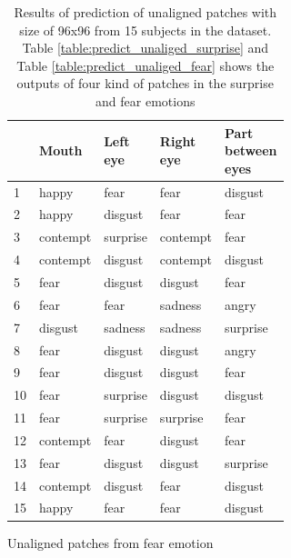 \begin{table}
\begin{subtable}{3in}
\begin{tabular}{|*{1}{p{0.2cm}<{\centering}|} *{1}{p{1.24cm}<{\centering}|} *{1}{p{1.2cm}<{\centering}|} *{1}{p{1.24cm}<{\centering}|} *{1}{p{1.2cm}<{\centering}|}}
    \hline
      & Mouth & \tabincell{c}{Left\\ eye} & \tabincell{c}{Right\\ eye} & \tabincell{c}{Part \\ between\\ eyes} \\
    \hline
    1 & happy & fear & fear & disgust \\
    2 & happy & disgust & fear & fear \\
    3 & contempt & surprise & contempt & fear \\
    4 & contempt & disgust & contempt & disgust \\
    5 & fear & disgust & disgust & fear \\
    6 & fear & fear & sadness & angry \\
    7 & disgust & sadness & sadness & surprise \\
    8 & fear & disgust & disgust & angry \\
    9 & fear & disgust & disgust & fear \\
    10 & fear & surprise & disgust & disgust \\
    11 & fear & surprise & surprise & fear \\
    12 & contempt & fear & disgust & fear \\
    13 & fear & disgust & disgust & surprise \\
    14 & contempt & disgust & fear & disgust \\
    15 & happy & fear & fear & disgust \\
    \hline
    \end{tabular}
    \caption{Unaligned patches from fear emotion}
    \label{table:predict_unaliged_fear}
    \end{subtable}

    \caption[Results of prediction of unaligned patches]{Results of prediction of unaligned patches with size of 96x96 from 15 subjects in the dataset. Table \ref{table:predict_unaliged_surprise} and Table \ref{table:predict_unaliged_fear} shows the outputs of four kind of patches in the surprise and fear emotions}
    \label{table:predict_unaliged_image}
\end{table}
